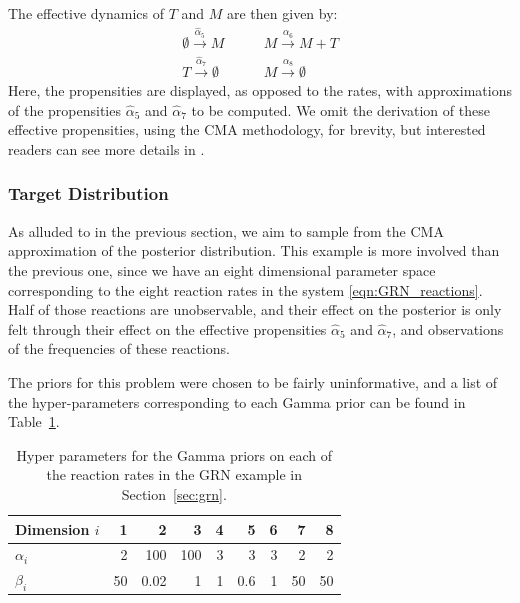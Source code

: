 \documentclass[final]{siamltex}
\begin{document}
The effective dynamics of $T$ and $M$ are then given by:
\begin{align}
	\emptyset \xrightarrow{\hat{\alpha}_5} M \quad & \quad M\xrightarrow{\alpha_6} M+T  \label{eqn:GRN_eff} \\
	T \xrightarrow{\hat{\alpha}_7} \emptyset \quad & \quad M \xrightarrow{\alpha_8} \emptyset \nonumber
\end{align}
Here, the propensities are displayed, as opposed to the rates, with
approximations of the propensities $\hat{\alpha}_5$ and
$\hat{\alpha}_7$ to be computed. We omit the derivation of these
effective propensities, using the CMA methodology, for brevity, but
interested readers can see more details in \cite{russ2017parallel}.

\subsubsection{Target Distribution}
As alluded to in the previous section, we aim to sample from the CMA
approximation of the posterior distribution. This example is more involved
than the previous one, since we have an eight dimensional parameter
space corresponding to the eight reaction rates in the system
\eqref{eqn:GRN_reactions}. Half of those reactions are
unobservable, and their effect on the posterior is only felt through
their effect on the effective propensities $\hat{\alpha}_5$ and
$\hat{\alpha}_7$, and observations of the frequencies of these reactions.

The priors for this problem were chosen to be fairly uninformative,
and a list of the hyper-parameters corresponding to each Gamma prior can be found in Table~\ref{tab:grn_priors}.

\begin{table}[!h]
\centering
\begin{tabular}{lrrrrrrrr}
	\hline
	Dimension $i$ & 1 & 2& 3& 4 & 5 & 6 & 7 & 8 \\ \hline
	$\alpha_i$ & 2 & 100 & 100 & 3 & 3 & 3 & 2 & 2\\ \hline
	$\beta_i$ &50 & 0.02 & 1 & 1 & 0.6 & 1 & 50 & 50 \\ \hline
\end{tabular}
\caption{Hyper parameters for the Gamma priors on each of the reaction rates in the GRN example in Section~\ref{sec:grn}.}
\label{tab:grn_priors}
\end{table}
\end{document}
